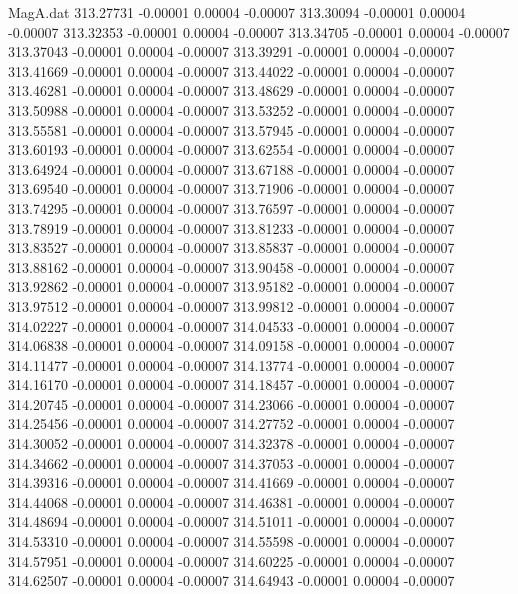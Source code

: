 \begin{filecontents}{MagA.dat}
 313.27731   -0.00001    0.00004   -0.00007
 313.30094   -0.00001    0.00004   -0.00007
 313.32353   -0.00001    0.00004   -0.00007
 313.34705   -0.00001    0.00004   -0.00007
 313.37043   -0.00001    0.00004   -0.00007
 313.39291   -0.00001    0.00004   -0.00007
 313.41669   -0.00001    0.00004   -0.00007
 313.44022   -0.00001    0.00004   -0.00007
 313.46281   -0.00001    0.00004   -0.00007
 313.48629   -0.00001    0.00004   -0.00007
 313.50988   -0.00001    0.00004   -0.00007
 313.53252   -0.00001    0.00004   -0.00007
 313.55581   -0.00001    0.00004   -0.00007
 313.57945   -0.00001    0.00004   -0.00007
 313.60193   -0.00001    0.00004   -0.00007
 313.62554   -0.00001    0.00004   -0.00007
 313.64924   -0.00001    0.00004   -0.00007
 313.67188   -0.00001    0.00004   -0.00007
 313.69540   -0.00001    0.00004   -0.00007
 313.71906   -0.00001    0.00004   -0.00007
 313.74295   -0.00001    0.00004   -0.00007
 313.76597   -0.00001    0.00004   -0.00007
 313.78919   -0.00001    0.00004   -0.00007
 313.81233   -0.00001    0.00004   -0.00007
 313.83527   -0.00001    0.00004   -0.00007
 313.85837   -0.00001    0.00004   -0.00007
 313.88162   -0.00001    0.00004   -0.00007
 313.90458   -0.00001    0.00004   -0.00007
 313.92862   -0.00001    0.00004   -0.00007
 313.95182   -0.00001    0.00004   -0.00007
 313.97512   -0.00001    0.00004   -0.00007
 313.99812   -0.00001    0.00004   -0.00007
 314.02227   -0.00001    0.00004   -0.00007
 314.04533   -0.00001    0.00004   -0.00007
 314.06838   -0.00001    0.00004   -0.00007
 314.09158   -0.00001    0.00004   -0.00007
 314.11477   -0.00001    0.00004   -0.00007
 314.13774   -0.00001    0.00004   -0.00007
 314.16170   -0.00001    0.00004   -0.00007
 314.18457   -0.00001    0.00004   -0.00007
 314.20745   -0.00001    0.00004   -0.00007
 314.23066   -0.00001    0.00004   -0.00007
 314.25456   -0.00001    0.00004   -0.00007
 314.27752   -0.00001    0.00004   -0.00007
 314.30052   -0.00001    0.00004   -0.00007
 314.32378   -0.00001    0.00004   -0.00007
 314.34662   -0.00001    0.00004   -0.00007
 314.37053   -0.00001    0.00004   -0.00007
 314.39316   -0.00001    0.00004   -0.00007
 314.41669   -0.00001    0.00004   -0.00007
 314.44068   -0.00001    0.00004   -0.00007
 314.46381   -0.00001    0.00004   -0.00007
 314.48694   -0.00001    0.00004   -0.00007
 314.51011   -0.00001    0.00004   -0.00007
 314.53310   -0.00001    0.00004   -0.00007
 314.55598   -0.00001    0.00004   -0.00007
 314.57951   -0.00001    0.00004   -0.00007
 314.60225   -0.00001    0.00004   -0.00007
 314.62507   -0.00001    0.00004   -0.00007
 314.64943   -0.00001    0.00004   -0.00007

\end{filecontents}
